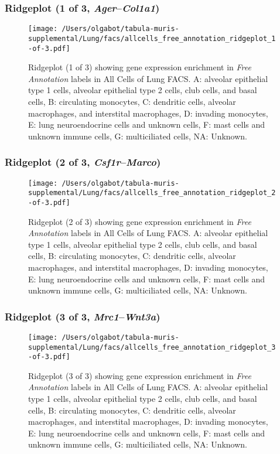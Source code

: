 \subsubsection{Ridgeplot (1 of 3, \emph{Ager}--\emph{Col1a1})}
\begin{figure}[h]
\centering
\texttt{[image: /Users/olgabot/tabula-muris-supplemental/Lung/facs/allcells\_free\_annotation\_ridgeplot\_1-of-3.pdf]}

\caption{ Ridgeplot (1 of 3)  showing gene expression enrichment in \emph{Free Annotation} labels in All Cells of Lung FACS. A: alveolar epithelial type 1 cells, alveolar epithelial type 2 cells, club cells, and basal cells, B: circulating monocytes, C: dendritic cells, alveolar macrophages, and interstital macrophages, D: invading monocytes, E: lung neuroendocrine cells and unknown cells, F: mast cells and unknown immune cells, G: multiciliated cells, NA: Unknown.}
\end{figure}


\clearpage

\subsubsection{Ridgeplot (2 of 3, \emph{Csf1r}--\emph{Marco})}
\begin{figure}[h]
\centering
\texttt{[image: /Users/olgabot/tabula-muris-supplemental/Lung/facs/allcells\_free\_annotation\_ridgeplot\_2-of-3.pdf]}

\caption{ Ridgeplot (2 of 3)  showing gene expression enrichment in \emph{Free Annotation} labels in All Cells of Lung FACS. A: alveolar epithelial type 1 cells, alveolar epithelial type 2 cells, club cells, and basal cells, B: circulating monocytes, C: dendritic cells, alveolar macrophages, and interstital macrophages, D: invading monocytes, E: lung neuroendocrine cells and unknown cells, F: mast cells and unknown immune cells, G: multiciliated cells, NA: Unknown.}
\end{figure}


\clearpage

\subsubsection{Ridgeplot (3 of 3, \emph{Mrc1}--\emph{Wnt3a})}
\begin{figure}[h]
\centering
\texttt{[image: /Users/olgabot/tabula-muris-supplemental/Lung/facs/allcells\_free\_annotation\_ridgeplot\_3-of-3.pdf]}

\caption{ Ridgeplot (3 of 3)  showing gene expression enrichment in \emph{Free Annotation} labels in All Cells of Lung FACS. A: alveolar epithelial type 1 cells, alveolar epithelial type 2 cells, club cells, and basal cells, B: circulating monocytes, C: dendritic cells, alveolar macrophages, and interstital macrophages, D: invading monocytes, E: lung neuroendocrine cells and unknown cells, F: mast cells and unknown immune cells, G: multiciliated cells, NA: Unknown.}
\end{figure}



